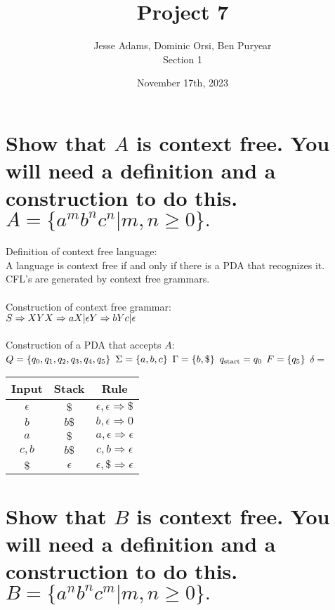 \documentclass{article}
\title{Project 7}
\author{Jesse Adams, Dominic Orsi, Ben Puryear\\Section 1}
\date{November 17th, 2023}
\begin{document}
\maketitle

\section{Show that $A$ is context free. You will need a definition and a construction to do this. \\ $A = \{a^m b^n c^n | m, n \ge 0\}.$}

Definition of context free language: \\
A language is context free if and only if there is a PDA that recognizes it. \\
CFL's are generated by context free grammars.
\\
\\
Construction of context free grammar: \\
$
    S \Rightarrow XY \\
    X \Rightarrow aX|\epsilon \\
    Y \Rightarrow bYc|\epsilon
$
\\
\\
Construction of a PDA that accepts $A$: \\
$Q = \{q_0, q_1, q_2, q_3, q_4, q_5\} \\$
$\Sigma = \{a, b, c\} \\$
$\Gamma = \{b, \$\} \\$
$q_{\text{start}} = q_0 \\$
$F = \{q_5\} \\$
$\delta =$
\begin{tabular}{ |c|c|c| }
    Input      & Stack      & Rule                                \\
    \hline
    $\epsilon$ & $\$$       & $\epsilon, \epsilon \Rightarrow \$$ \\
    $b$        & $b\$$      & $b, \epsilon \Rightarrow 0$         \\
    $a$        & $\$$       & $a, \epsilon \Rightarrow \epsilon$  \\
    $c, b$     & $b\$$      & $c, b \Rightarrow \epsilon$         \\
    $\$$       & $\epsilon$ & $\epsilon, \$ \Rightarrow \epsilon$ \\
\end{tabular}

\pagebreak

\section{Show that $B$ is context free. You will need a definition and a construction to do this. \\ $B = \{a^n b^n c^m | m, n \ge 0\}.$}
\end{document}
